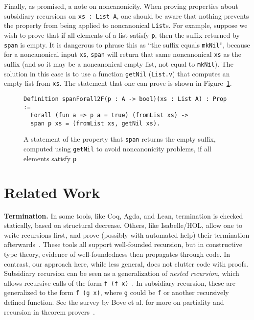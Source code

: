 \documentclass[a4paper,USenglish]{lipics-v2021}
\begin{document}
Finally, as promised, a note on noncanonicity. When proving properties about subsidiary
recursions on \verb|xs : List A|, one should be aware that nothing prevents
the property from being applied to noncanonical \verb|List|s.  For example,
suppose we wish to prove that if all elements of a  list satisfy \verb|p|, then
the suffix returned by \verb|span| is empty.  It is dangerous to phrase
this as ``the suffix equals \verb|mkNil|'', because for a noncanonical input \verb|xs|,
\verb|span| will return that same  noncanonical \verb|xs| as the suffix (and so
it may be a noncanonical empty list, not equal to \verb|mkNil|).  The solution
in this case is to use a function \verb|getNil| (\verb|List.v|) that computes
an empty list from \verb|xs|.  The statement that one can prove is shown in Figure~\ref{fig:spanforallt}.

\begin{figure}
\begin{verbatim}
Definition spanForall2F(p : A -> bool)(xs : List A) : Prop :=
  Forall (fun a => p a = true) (fromList xs) ->
  span p xs = (fromList xs, getNil xs).
\end{verbatim}
\caption{A statement of the property that \texttt{span} returns the empty suffix, computed using \texttt{getNil} to avoid noncanonicity problems, if all elements satisfy \texttt{p}}
\label{fig:spanforallt}
\end{figure}

\section{Related Work}
\label{sec:related}

\textbf{Termination.}  In some tools, like Coq, Agda, and Lean,
termination is checked statically, based on structural decrease.
Others, like Isabelle/HOL, allow one to write recursions first, and
prove (possibly with automated help) their termination
afterwards~\cite{krauss}.  These tools all support well-founded
recursion, but in constructive type theory, evidence of
well-foundedness then propagates through code.  In contrast, our
approach here, while less general, does not clutter code with proofs.
Subsidiary recursion can be seen as a generalization of \emph{nested
recursion}, which allows recursive calls of the form
\verb|f (f x)|~\cite{krauss10}.  In subsidiary recursion, these are
generalized to the form \verb|f (g x)|, where \verb|g| could be
\verb|f| or another recursively defined function.  See the survey by
Bove et al. for more on partiality and recursion in theorem
provers~\cite{bove+16}.
\end{document}
